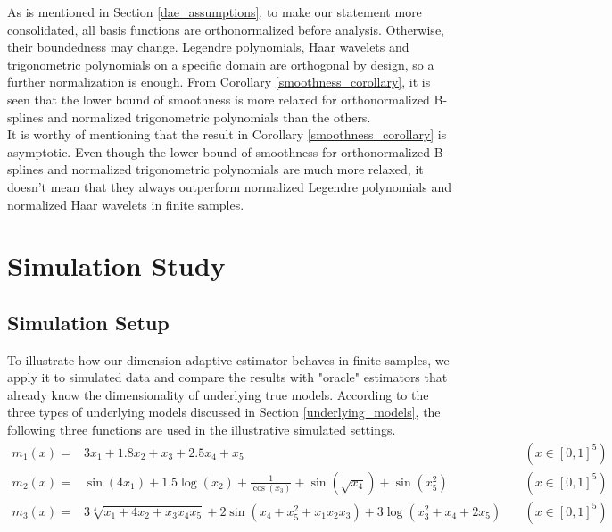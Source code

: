 \documentclass[12pt, a4paper]{article}
\theoremstyle{MAstyle} \newtheorem{assumption}{Assumption}[section]
\theoremstyle{MAstyle} \newtheorem{definition}{Definition}[section]
\theoremstyle{MAstyle} \newtheorem{theorem}{Theorem}[section]
\theoremstyle{MAstyle} \newtheorem{corollary}{Corollary}[section]
\begin{document}
                    As is mentioned in Section \ref{dae_assumptions}, to make our statement more consolidated, all basis functions are orthonormalized before analysis. Otherwise, their boundedness may change. Legendre polynomials, Haar wavelets and trigonometric polynomials on a specific domain are orthogonal by design, so a further normalization is enough. From Corollary \ref{smoothness_corollary}, it is seen that the lower bound of smoothness is more relaxed for orthonormalized B-splines and normalized trigonometric polynomials than the others. \\

                    It is worthy of mentioning that the result in Corollary \ref{smoothness_corollary} is asymptotic. Even though the lower bound of smoothness for orthonormalized B-splines and normalized trigonometric polynomials are much more relaxed, it doesn't mean that they always outperform normalized Legendre polynomials and normalized Haar wavelets in finite samples. 
                    
        \newpage
        \section{Simulation Study}\label{simulation_study}
            \subsection{Simulation Setup}\label{simulation_setup}
                To illustrate how our dimension adaptive estimator behaves in finite samples, we apply it to simulated data and compare the results with "oracle" estimators that already know the dimensionality of underlying true models. According to the three types of underlying models discussed in Section \ref{underlying_models}, the following three functions are used in the illustrative simulated settings.
                \begin{align*}
                    m_1(x)=&3x_1+1.8x_2+x_3+2.5x_4+x_5 &\quad (x \in [0,1]^5)\\
                    m_2(x)=&\sin(4x_1)+1.5\log(x_2)+\frac{1}{\cos(x_3)}+\sin(\sqrt{x_4})+\sin(x_5^2) &\quad (x \in [0,1]^5)\\
                    m_3(x)=&3\sqrt[4]{x_1+4x_2+x_3x_4x_5}+2\sin(x_4+x_5^2+x_1x_2x_3)+3\log(x_3^2+x_4+2x_5) &\quad (x \in [0,1]^5)
                \end{align*}
\end{document}
